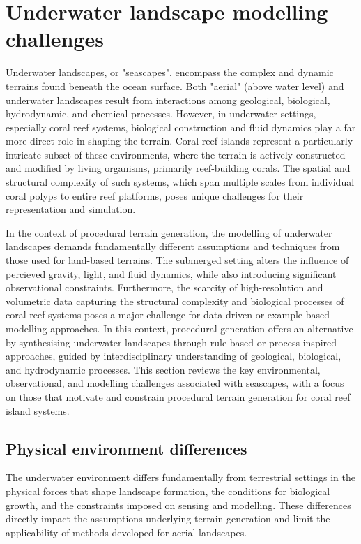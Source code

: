 \section{Underwater landscape modelling challenges}
Underwater landscapes, or "seascapes", encompass the complex and dynamic terrains found beneath the ocean surface. 
Both "aerial" (above water level) and underwater landscapes result from interactions among geological, biological, hydrodynamic, and chemical processes. However, in underwater settings, especially coral reef systems, biological construction and fluid dynamics play a far more direct role in shaping the terrain.
Coral reef islands represent a particularly intricate subset of these environments, where the terrain is actively constructed and modified by living organisms, primarily reef-building corals. The spatial and structural complexity of such systems, which span multiple scales from individual coral polyps to entire reef platforms, poses unique challenges for their representation and simulation.

In the context of procedural terrain generation, the modelling of underwater landscapes demands fundamentally different assumptions and techniques from those used for land-based terrains. The submerged setting alters the influence of percieved gravity, light, and fluid dynamics, while also introducing significant observational constraints. Furthermore, the scarcity of high-resolution and volumetric data capturing the structural complexity and biological processes of coral reef systems poses a major challenge for data-driven or example-based modelling approaches. In this context, procedural generation offers an alternative by synthesising underwater landscapes through rule-based or process-inspired approaches, guided by interdisciplinary understanding of geological, biological, and hydrodynamic processes. This section reviews the key environmental, observational, and modelling challenges associated with seascapes, with a focus on those that motivate and constrain procedural terrain generation for coral reef island systems.

\subsection{Physical environment differences}
The underwater environment differs fundamentally from terrestrial settings in the physical forces that shape landscape formation, the conditions for biological growth, and the constraints imposed on sensing and modelling. These differences directly impact the assumptions underlying terrain generation and limit the applicability of methods developed for aerial landscapes.


